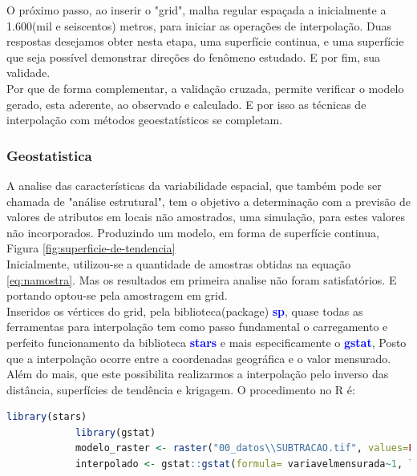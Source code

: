 		\hspace*{1.25 cm}  O próximo passo, ao inserir o "grid", malha regular espaçada a inicialmente a 1.600(mil e seiscentos) metros, para iniciar as operações de interpolação. Duas respostas desejamos obter nesta etapa,  uma superfície continua, e uma superfície que seja possível demonstrar direções do fenômeno estudado. E por fim, sua validade. \\
		\hspace*{1.25 cm} Por que de  forma complementar, a validação cruzada, permite  verificar o modelo gerado, esta aderente, ao observado e calculado. E por isso as técnicas de interpolação com métodos geoestatísticos se completam. 
		
		\subsubsection{Geostatistica}
		\hspace*{1.25 cm} A analise das características da variabilidade espacial, que também pode ser chamada de "análise estrutural", tem o objetivo a determinação com a previsão de valores de atributos em locais não amostrados, uma simulação, para estes valores não incorporados. Produzindo um modelo, em forma de superfície continua, Figura \ref{fig:superficie-de-tendencia}\\
\hspace*{1.25 cm} Inicialmente, utilizou-se a quantidade de amostras obtidas na equação \eqref{eq:namostra}. Mas os resultados em primeira analise não foram satisfatórios. E portando optou-se pela amostragem em grid.\\
		\hspace*{1.25 cm} Inseridos os vértices do grid, pela biblioteca(package) \textbf{\textcolor{blue}{sp}}, quase todas as ferramentas para interpolação tem como passo fundamental o carregamento e perfeito funcionamento da biblioteca \textbf{\textcolor{blue}{stars}} e mais especificamente o \textbf{\textcolor{blue}{gstat}}, Posto que a interpolação ocorre entre a coordenadas geográfica e o valor mensurado. Além do mais, que este possibilita realizarmos a interpolação pelo inverso das distância, superfícies de tendência e krigagem.  O procedimento no R é: 
		\lstset{
			language=R, %
			caption= Interpolação em linguagem R,} %
		\begin{lstlisting}[language=R]
			library(stars)
			library(gstat)
			modelo_raster <- raster("00_datos\\SUBTRACAO.tif", values=FALSE)
			interpolado <- gstat::gstat(formula= variavelmensurada~1, locations = arquivodogrid, set = parametrosdomodelo )	   
		\end{lstlisting}  
